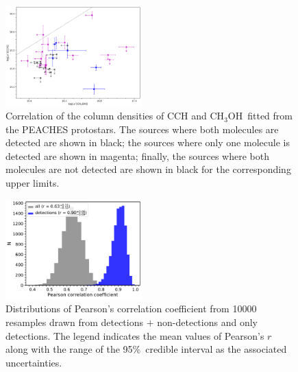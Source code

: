 \documentclass[twocolumn]{aastex62}
\newcommand{\methanol}{\mbox{CH$_{3}$OH}}
\begin{document}
\begin{figure}[htbp!]
  \centering
  \includegraphics[width=0.47\textwidth]{Ncol_ch3oh_cch.pdf}
  \caption{Correlation of the column densities of CCH and \methanol\ fitted from the PEACHES protostars.  The sources where both molecules are detected are shown in black; the sources where only one molecule is detected are shown in magenta; finally, the sources where both molecules are not detected are shown in black for the corresponding upper limits.}
  \label{fig:cch_ch3oh}
\end{figure}

\begin{figure}[htbp!]
  \centering
  \includegraphics[width=0.47\textwidth]{pearson_r_ch3oh_ch3cn.pdf}
  \caption{Distributions of Pearson's correlation coefficient from 10000 resamples drawn from detections $+$ non-detections and only detections.  The legend indicates the mean values of Pearson's $r$ along with the range of the 95\%\ credible interval as the associated uncertainties.}
  \label{fig:pearson_distribution}
\end{figure}
\end{document}
